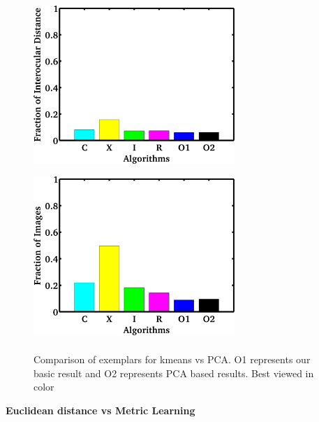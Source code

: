 \begin{figure}
  \centering
  \includegraphics[width=3.0in,height=2.5in]{fid/figures/iccv_version_one/cofw/kmeans_shape_vs_kmeans_pca/mean_err_modified.jpg}
  \includegraphics[width=3.0in,height=2.5in]{fid/figures/iccv_version_one/cofw/kmeans_shape_vs_kmeans_pca/fail_rate_modified.jpg}
  \caption{ Comparison of exemplars for kmeans vs PCA. O1 represents our basic result and O2
  represents PCA based results. Best viewed in color }
  \label{fig:kmeans_vs_pca}
\end{figure}
% 
% 
\textbf{Euclidean distance vs Metric Learning}
\label{subsec:euc_vs_metric}

